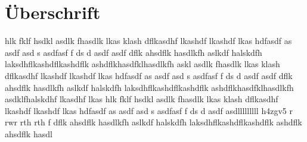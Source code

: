 \documentclass[12px, twocolumn, a4paper]{article}
\begin{document}
\section{Überschrift}
hlk fklf hsdkl asdlk fhasdlk lkas klash dflkasdhf lkashdf lkashdf lkas hdfasdf as asdf asd s asdfasf f ds  d asdf asdf dflk ahsdflk hasdlkfh aslkdf halskdfh laksdhflkashdflkashdflk ashdflkhasdfklhasdlkfh askl asdlk fhasdlk lkas klash dflkasdhf lkashdf lkashdf lkas hdfasdf as asdf asd s asdfasf f ds  d asdf asdf dflk ahsdflk hasdlkfh aslkdf halskdfh laksdhflkashdflkashdflk ashdflkhasdfklhasdlkfh asdklfhalskdhf lkasdhf lkas \cite{brooks2001-silver}
hlk fklf hsdkl asdlk fhasdlk lkas klash dflkasdhf lkashdf lkashdf lkas hdfasdf as asdf asd s asdfasf f ds  d asdf asdlllllllll h4zgv5 r rwr rth rth f dflk ahsdflk hasdlkfh aslkdf halskdfh laksdhflkashdflkashdflk ashdflk ahsdflk hasdl \cite{Beckertest}

\newpage



\end{document}
